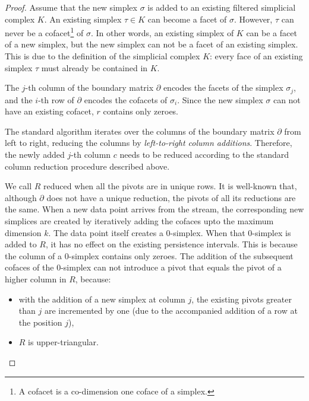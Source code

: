 \documentclass[11pt]{article}
\begin{document}
\begin{proof}
	Assume that the new simplex $\sigma$ is added to an existing filtered simplicial complex $K$.  
	An existing simplex $\tau \in K$ can become a facet of $\sigma$.  However, $\tau$ can never be 
	a cofacet\footnote{A cofacet is a co-dimension one coface of a simplex.} of $\sigma$.  In other 
	words, an existing simplex of $K$ can be a facet of a new simplex, but the new simplex can not 
	be a facet of an existing simplex.  This is due to the definition of the simplicial complex 
	$K$: every face of an existing simplex $\tau$ must already be contained in $K$.
	
	The $j$-th column of the boundary matrix $\partial$ encodes the facets of the simplex 
	$\sigma_j$, and the $i$-th row of $\partial$ encodes the cofacets of $\sigma_i$.  Since the new 
	simplex $\sigma$ can not have an existing cofacet, $r$ contains only zeroes.
	
	
	The standard algorithm iterates over the columns of the boundary matrix $\partial$ from left to 
	right, reducing the columns by \emph{left-to-right column additions}.  Therefore, the newly 
	added $j$-th column $c$ needs to be reduced according to the standard column reduction 
	procedure described above.
	
	
	We call $R$ reduced when all the pivots are in unique rows.  It is well-known that, although 
	$\partial$ does not have a unique reduction, the pivots of all its reductions are the same.  
	When a new data point arrives from the stream, the corresponding new simplices are created by 
	iteratively adding the cofaces upto the maximum dimension $k$.  The data point itself creates a 
	0-simplex.  When that 0-simplex is added to $R$, it has no effect on the existing persistence 
	intervals.  This is because the column of a 0-simplex contains only zeroes.  The addition of 
	the subsequent cofaces of the 0-simplex can not introduce a pivot that equals the pivot of a 
	higher column in $R$, because:
	
	
	\begin{itemize}
		\item with the addition of a new simplex at column $j$, the existing pivots greater than 
		$j$ are incremented by one (due to the accompanied addition of a row at the position $j$),
		\item $R$ is upper-triangular.
	\end{itemize}
	
\end{proof}




\end{document}
